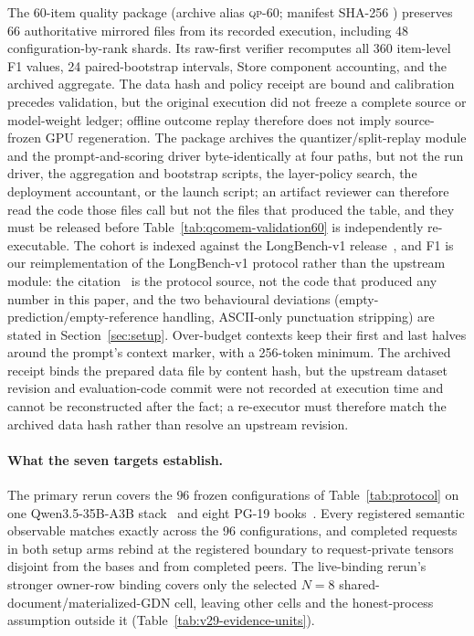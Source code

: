 \documentclass{article}
\begin{document}
The 60-item quality package (archive alias \textsc{qp-60}; manifest SHA-256
)
preserves 66 authoritative mirrored files from its recorded execution,
including 48 configuration-by-rank shards.  Its
raw-first verifier recomputes all 360 item-level F1 values, 24 paired-bootstrap
intervals, Store component accounting, and the archived aggregate.  The data
hash and policy receipt are bound and calibration precedes validation, but the
original execution did not freeze a complete source or model-weight ledger;
offline outcome replay therefore does not imply source-frozen GPU
regeneration.  The package archives the quantizer/split-replay module and the
prompt-and-scoring driver byte-identically at four paths, but not the run
driver, the aggregation and bootstrap scripts, the layer-policy search, the
deployment accountant, or the launch script; an artifact reviewer can therefore
read the code those files call but not the files that produced the table, and
they must be released before Table~\ref{tab:qcomem-validation60} is
independently re-executable.  The cohort is indexed against the LongBench-v1
release~\citep{bai2024longbenchrelease}, and F1 is our reimplementation of the
LongBench-v1  protocol rather than the upstream module: the
citation~\citep{bai2024longbenchcode} is the protocol source, not the code that
produced any number in this paper, and the two behavioural deviations
(empty-prediction/empty-reference handling, ASCII-only punctuation stripping)
are stated in Section~\ref{sec:setup}.  Over-budget contexts keep their first
and last halves around the prompt's context marker, with a 256-token minimum.  The
archived receipt binds the prepared data file by content hash, but the upstream
dataset revision and evaluation-code commit were not recorded at execution time
and cannot be reconstructed after the fact; a re-executor must therefore match
the archived data hash rather than resolve an upstream revision.

\paragraph{What the seven targets establish.}
The primary rerun covers the $96$ frozen configurations of
Table~\ref{tab:protocol} on one
Qwen3.5-35B-A3B stack~\citep{qwen2026qwen35,qwen2026qwen35modelcard} and eight
PG-19 books~\citep{rae2020compressive}.
Every registered semantic observable matches exactly across the 96
configurations, and completed requests in both setup arms rebind at the
registered boundary to request-private tensors disjoint from the bases and from
completed peers.  The live-binding rerun's stronger owner-row binding covers only
the selected $N=8$ shared-document/materialized-GDN cell, leaving other cells and
the honest-process assumption outside it (Table~\ref{tab:v29-evidence-units}).
\end{document}
